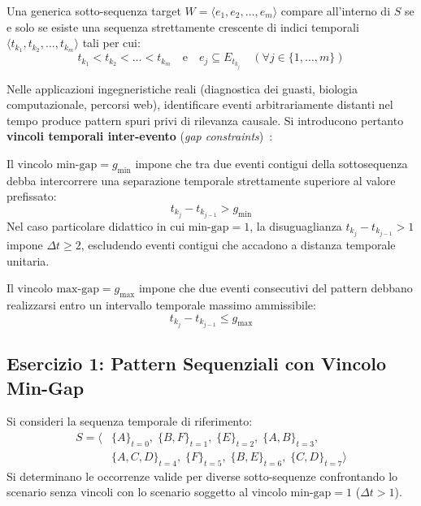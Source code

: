 Una generica sotto-sequenza target $W = \langle e_1, e_2, \dots, e_m \rangle$ compare all'interno di $S$ se e solo se esiste una sequenza strettamente crescente di indici temporali $\langle t_{k_1}, t_{k_2}, \dots, t_{k_m} \rangle$ tali per cui:
\begin{equation}
t_{k_1} < t_{k_2} < \dots < t_{k_m} \quad \text{e} \quad e_j \subseteq E_{t_{k_j}} \quad (\forall j \in \{1, \dots, m\})
\end{equation}

Nelle applicazioni ingegneristiche reali (diagnostica dei guasti, biologia computazionale, percorsi web), identificare eventi arbitrariamente distanti nel tempo produce pattern spuri privi di rilevanza causale. Si introducono pertanto \textbf{vincoli temporali inter-evento} (\textit{gap constraints})~\cite{srikant1996}:
\begin{definition}
Il vincolo $\text{min-gap} = g_{\min}$ impone che tra due eventi contigui della sottosequenza debba intercorrere una separazione temporale strettamente superiore al valore prefissato:
\begin{equation}
t_{k_j} - t_{k_{j-1}} > g_{\min}
\end{equation}
Nel caso particolare didattico in cui $\text{min-gap} = 1$, la disuguaglianza $t_{k_j} - t_{k_{j-1}} > 1$ impone $\Delta t \ge 2$, escludendo eventi contigui che accadono a distanza temporale unitaria.
\end{definition}

\begin{definition}
Il vincolo $\text{max-gap} = g_{\max}$ impone che due eventi consecutivi del pattern debbano realizzarsi entro un intervallo temporale massimo ammissibile:
\begin{equation}
t_{k_j} - t_{k_{j-1}} \le g_{\max}
\end{equation}
\end{definition}

\FloatBarrier
\subsection{Esercizio 1: Pattern Sequenziali con Vincolo Min-Gap}
\label{sec:dm-seq-min-gap-exercise}

Si consideri la sequenza temporale di riferimento:
\begin{align}
S = \big\langle &\{A\}_{t=0}, \; \{B, F\}_{t=1}, \; \{E\}_{t=2}, \; \{A, B\}_{t=3}, \nonumber \\
&\{A, C, D\}_{t=4}, \; \{F\}_{t=5}, \; \{B, E\}_{t=6}, \; \{C, D\}_{t=7} \big\rangle
\end{align}
Si determinano le occorrenze valide per diverse sotto-sequenze confrontando lo scenario senza vincoli con lo scenario soggetto al vincolo $\text{min-gap} = 1$ ($\Delta t > 1$).

